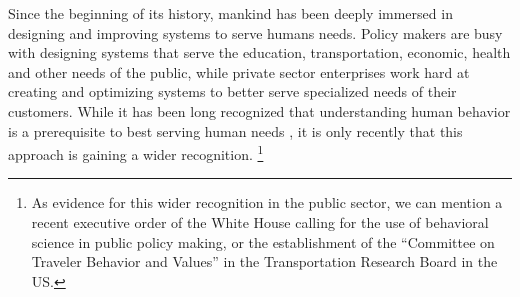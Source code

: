 Since the beginning of its history, mankind has been deeply immersed in 
	designing and improving systems to serve humans needs.
Policy makers are busy with designing 
	systems that serve the education, transportation, economic, health and other 
	needs of the public,
while private sector enterprises work hard at creating 
	and optimizing systems to better serve  
	specialized needs of their customers.
While it has been long recognized that 
	understanding human behavior is a prerequisite 
	to best serving human needs \citep[e.g.,]{Simon:1959kd},
	it is only recently that this approach is gaining a wider recognition.%
\footnote{
As evidence for this wider recognition in the public sector,
we can mention a recent executive order of the White House
calling for the use of behavioral science in public policy making, 
or the establishment of the ``Committee on Traveler Behavior and Values'' in the Transportation
Research Board in the US.}

